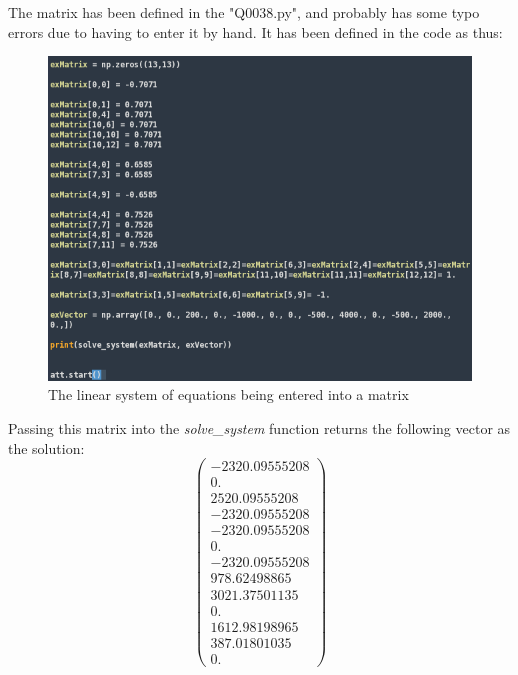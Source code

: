 The matrix has been defined in the "Q0038.py", and probably has some typo errors due to having to enter it by hand. It has been defined in the code as thus:\\
\begin{figure}[ht]
  \includegraphics[width=1\linewidth]{linear_system}
  \caption{The linear system of equations being entered into a matrix}
\end{figure}

Passing this matrix into the \textit{solve\_system} function returns the following vector as the solution:
$$
\begin{pmatrix}
  -2320.09555208 \\
  0. \\
  2520.09555208 \\
  -2320.09555208 \\
  -2320.09555208 \\
  0. \\
  -2320.09555208 \\
  978.62498865 \\
  3021.37501135 \\
  0. \\
  1612.98198965 \\
  387.01801035 \\
  0.
\end{pmatrix}
$$
